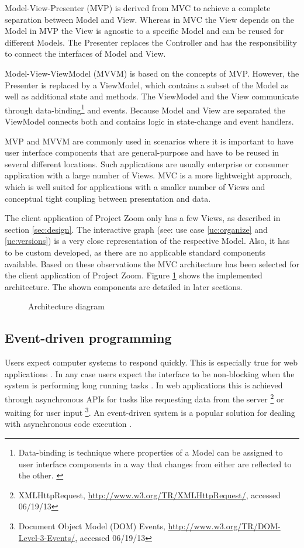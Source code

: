 Model-View-Presenter (MVP) is derived from MVC to achieve a complete separation between Model and View. Whereas in MVC the View depends on the Model in MVP the View is agnostic to a specific Model and can be reused for different Models. The Presenter replaces the Controller and has the responsibility to connect the interfaces of Model and View. 

Model-View-ViewModel (MVVM) is based on the concepts of MVP. However, the Presenter is replaced by a ViewModel, which contains a subset of the Model as well as additional state and methods. The ViewModel and the View communicate through data-binding\footnote{Data-binding is technique where properties of a Model can be assigned to user interface components in a way that changes from either are reflected to the other. \cite{Bent_2004}} and events. Because Model and View are separated the ViewModel connects both and contains logic in state-change and event handlers.

MVP and MVVM are commonly used in scenarios where it is important to have user interface components that are general-purpose and have to be reused in several different locations. Such applications are usually enterprise or consumer application with a large number of Views. MVC is a more lightweight approach, which is well suited for applications with a smaller number of Views and conceptual tight coupling between presentation and data. \cite{Osmani_2012}

The client application of Project Zoom only has a few Views, as described in section \ref{sec:design}. The interactive graph (see: use case \ref{uc:organize} and \ref{uc:versions}) is a very close representation of the respective Model. Also, it has to be custom developed, as there are no applicable standard components available. Based on these observations the MVC architecture has been selected for the client application of Project Zoom. Figure \ref{fig:arch} shows the implemented architecture. The shown components are detailed in later sections.

\begin{figure}
\caption{Architecture diagram}
\label{fig:arch}
\end{figure}


\subsection{Event-driven programming}
\label{sec:eventbased}

Users expect computer systems to respond quickly. This is especially true for web applications \cite{Selvidge_1999}. In any case users expect the interface to be non-blocking when the system is performing long running tasks \cite{Nielsen_1994}.  In web applications this is achieved through asynchronous APIs for tasks like requesting data from the server \footnote{XMLHttpRequest, \url{http://www.w3.org/TR/XMLHttpRequest/}, accessed 06/19/13} or waiting for user input \footnote{Document Object Model (DOM) Events, \url{http://www.w3.org/TR/DOM-Level-3-Events/}, accessed 06/19/13}. An event-driven system is a popular solution for dealing with asynchronous code execution \cite{Michelson_2006}. 

